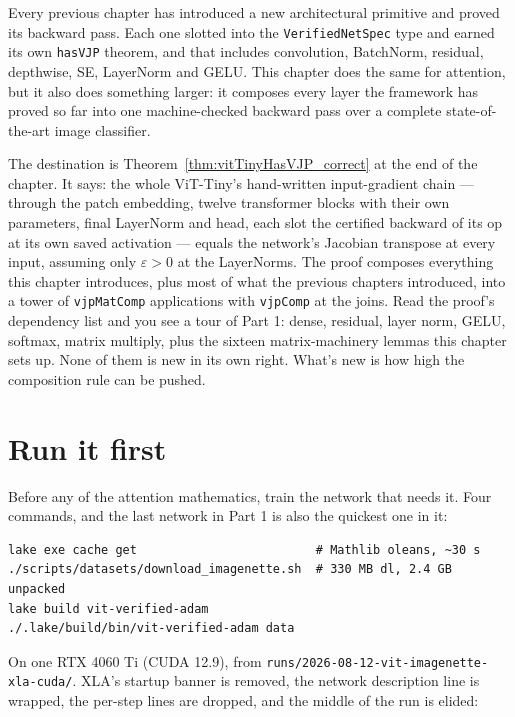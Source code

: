 Every previous chapter has introduced a new architectural primitive
and proved its backward pass. Each one slotted into the
\texttt{VerifiedNetSpec} type and earned its own \texttt{hasVJP}
theorem, and that includes convolution, BatchNorm, residual,
depthwise, SE, LayerNorm and GELU.
This chapter does the same for attention, but it also does
something larger: it composes every layer the framework has
proved so far into one machine-checked backward pass over a
complete state-of-the-art image classifier.

The destination is Theorem~\ref{thm:vitTinyHasVJP_correct} at the
end of the chapter. It says: the whole ViT-Tiny's hand-written
input-gradient chain --- through the patch embedding, twelve transformer
blocks with their own parameters, final LayerNorm and head, each slot the
certified backward of its op at its own saved activation --- equals the
network's Jacobian transpose at every input, assuming only
\(\varepsilon > 0\) at the LayerNorms. The proof
composes everything this chapter introduces, plus most of what the
previous chapters introduced, into a tower of \texttt{vjpMatComp}
applications with \texttt{vjpComp} at the joins. Read the proof's
dependency list and you see a tour of Part 1: dense, residual, layer
norm, GELU, softmax, matrix multiply, plus the sixteen matrix-machinery
lemmas this chapter sets up. None of them is new in its own right.
What's new is how high the composition rule can be pushed.

\section{Run it first}
\label{sec:vit_runit}

Before any of the attention mathematics, train the network that needs
it. Four commands, and the last network in Part 1 is also the quickest
one in it:

\begin{verbatim}
lake exe cache get                         # Mathlib oleans, ~30 s
./scripts/datasets/download_imagenette.sh  # 330 MB dl, 2.4 GB unpacked
lake build vit-verified-adam
./.lake/build/bin/vit-verified-adam data
\end{verbatim}

On one RTX 4060 Ti (CUDA 12.9), from
\texttt{runs/2026-08-12-vit-imagenette-xla-cuda/}. XLA's startup banner
is removed, the network description line is wrapped, the per-step lines
are dropped, and the middle of the run is elided:

